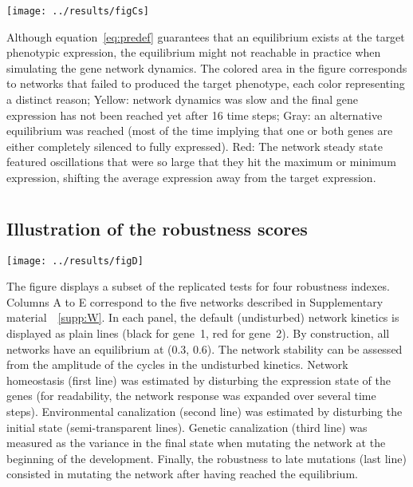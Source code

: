 \documentclass[a4paper]{article}
\newcommand{\SupMat}{Supplementary material~}
\begin{document}
\begin{appendices}
	\texttt{[image: ../results/figCs]}
	
	Although equation~\ref{eq:predef} guarantees that an equilibrium exists at the target phenotypic expression, the equilibrium might not reachable in practice when simulating the gene network dynamics. The colored area in the figure corresponds to networks that failed to produced the target phenotype, each color representing a distinct reason; Yellow: network dynamics was slow and the final gene expression has not been reached yet after 16 time steps; Gray: an alternative equilibrium was reached (most of the time implying that one or both genes are either completely silenced to fully expressed). Red: The network steady state featured oscillations that were so large that they hit the maximum or minimum expression, shifting the average expression away from the target expression. 

  \clearpage


  \clearpage
  \section{}
    \label{supp:simpanels}
    \subsection*{Illustration of the robustness scores}

	\texttt{[image: ../results/figD]}
	
	The figure displays a subset of the replicated tests for four robustness indexes. Columns A to E correspond to the five networks described in \SupMat~\ref{supp:W}. In each panel, the default (undisturbed) network kinetics is displayed as plain lines (black for gene~1, red for gene~2). By construction, all networks have an equilibrium at (0.3, 0.6). The network stability can be assessed from the amplitude of the cycles in the undisturbed kinetics. Network homeostasis (first line) was estimated by disturbing the expression state of the genes (for readability, the network response was expanded over several time steps). Environmental canalization (second line) was estimated by disturbing the initial state (semi-transparent lines). Genetic canalization (third line) was measured as the variance in the final state when mutating the network at the beginning of the development. Finally, the robustness to late mutations (last line) consisted in mutating the network after having reached the equilibrium.


  \clearpage
  \section{}
    \label{supp:sensitmag}

\end{appendices}
\end{document}
